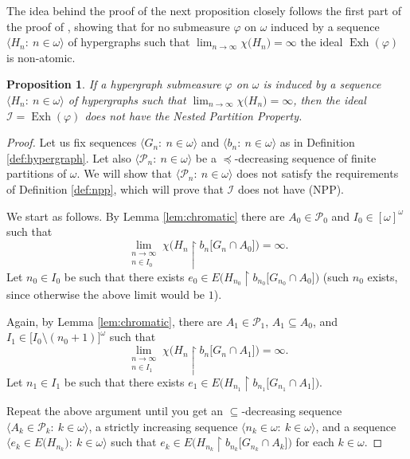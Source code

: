 \documentclass[a4paper,11pt,fleqn]{amsart}
\newtheorem{proposition}[theorem]{Proposition}
\theoremstyle{definition}
\theoremstyle{remark}
\numberwithin{equation}{section}
\newcommand{\N}{\mathbb{N}}
\newcommand{\iI}{\mathcal{I}}
\newcommand{\pP}{\mathcal{P}}
\DeclareMathOperator{\exh}{Exh}
\newcommand{\rstr}{\restriction}
\newcommand{\sm}{\setminus}
\newcommand{\sub}{\subseteq}
\newcommand{\seqn}[1]{\big\langle#1\colon\ n\io\big\rangle}
\newcommand{\seqk}[1]{\big\langle#1\colon\ k\io\big\rangle}
\newcommand{\ctblsub}[1]{\left[#1\right]^\omega}
\newcommand{\io}{\in\omega}%
\begin{document}
The idea behind the proof of the next proposition closely follows the first part of the proof of \cite[Theorem 2.3]{ADL09}, showing that for no submeasure $\varphi$ on $\omega$ induced by a sequence $\seqn{H_n}$ of hypergraphs such that $\lim_{n\to\infty}\chi\big(H_n\big)=\infty$ the ideal $\exh(\varphi)$ is non-atomic.

\begin{proposition}\label{prop:hypergraph_npp}
    If a hypergraph submeasure $\varphi$ on $\omega$ is induced by a sequence $\seqn{H_n}$ of hypergraphs such that $\lim_{n\to\infty}\chi\big(H_n\big)=\infty$, then the ideal $\iI=\exh(\varphi)$ does not have the Nested Partition Property.
\end{proposition}
\begin{proof}
    Let us fix sequences $\seqn{G_n}$ and $\seqn{b_n}$ as in Definition \ref{def:hypergraph}. Let also $\seqn{\pP_n}$ be a $\preceq$-decreasing sequence of finite partitions of $\omega$. We will show that $\seqn{\pP_n}$ does not satisfy the requirements of Definition \ref{def:npp}, which will prove that $\iI$ does not have (NPP).

    We start as follows. By Lemma \ref{lem:chromatic} there are $A_0\in\pP_0$ and $I_0\in\ctblsub{\omega}$ such that
    \[\lim_{\substack{n\to\infty\\n\in I_0}}\chi\Big(H_n\rstr b_n\big[G_n\cap A_0\big]\Big)=\infty.\]
    Let $n_0\in I_0$ be such that there exists $e_0\in E\Big(H_{n_0}\rstr b_{n_0}\big[G_{n_0}\cap A_0\big]\Big)$ (such $n_0$ exists, since otherwise the above limit would be $1$). %

    Again, by Lemma \ref{lem:chromatic}, there are  $A_1\in\pP_1$, $A_1\sub A_0$, and $I_1\in\big[I_0\sm(n_0+1)\big]^\omega$ such that
    \[\lim_{\substack{n\to\infty\\n\in I_1}}\chi\Big(H_n\rstr b_n\big[G_n\cap A_1\big]\Big)=\infty.\]
    Let $n_1\in I_1$ be such that there exists $e_1\in E\Big(H_{n_1}\rstr b_{n_1}\big[G_{n_1}\cap A_1\big]\Big)$. %

    Repeat the above argument until you get an $\subseteq$-decreasing sequence $\seqk{A_k\in\pP_k}$, a strictly increasing sequence $\seqk{n_k\io}$, and a sequence $\seqk{e_k\in E\big(H_{n_k}\big)}$ such that $e_k\in E\Big(H_{n_k}\rstr b_{n_k}\big[G_{n_k}\cap A_k\big]\Big)$ for each $k\io$.


\end{proof}
\end{document}
